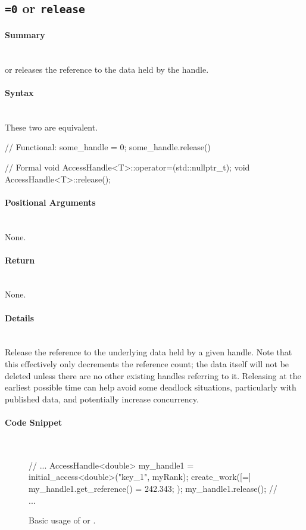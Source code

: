 \subsection{\texttt{=0} or \texttt{release}}

\paragraph{Summary} \mbox{}\\
 or  releases the reference to the data held by the
\gls{handle}.

\paragraph{Syntax} \mbox{}\\
These two are equivalent.
\begin{CppCode}
// Functional:
some_handle = 0;    
some_handle.release()

// Formal
void AccessHandle<T>::operator=(std::nullptr_t);
void AccessHandle<T>::release();
\end{CppCode}


\paragraph{Positional Arguments} \mbox{}\\
None.

\paragraph{Return} \mbox{}\\
None.

\paragraph{Details} \mbox{}\\
Release the reference to the underlying data held by a given \gls{handle}.  Note that
this effectively only decrements the reference count; the data itself will not
be deleted unless there are no other existing \glspl{handle} referring to it.  Releasing
at the earliest possible time can help avoid some deadlock situations,
particularly with published data, and potentially increase \gls{concurrency}.

\paragraph{Code Snippet} \mbox{}\\
\begin{figure}[!h]
\begin{CppCodeNumb}
// ...
AccessHandle<double> my_handle1 = initial_access<double>("key_1", myRank);
create_work([=]{
	my_handle1.get_reference() = 242.343;
});
my_handle1.release();
// ...
\end{CppCodeNumb}
\label{fig:fe_api_release}
\caption{Basic usage of \protect{} or \protect{}.}
\end{figure}


